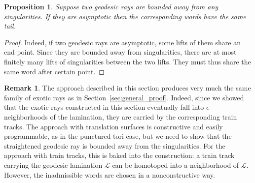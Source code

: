 \documentclass[11pt]{article} %
\theoremstyle{plain}
\newtheorem{prop}[thm]{Proposition}
\theoremstyle{definition}
\newtheorem{rmk}[thm]{Remark}
\numberwithin{equation}{section}
\begin{document}
\begin{prop}\label{prop:tail}
Suppose two geodesic rays are bounded away from any singularities. If they are asymptotic then the corresponding words have the same tail.
\end{prop}
\begin{proof}
Indeed, if two geodesic rays are asymptotic, some lifts of them share an end point. Since they are bounded away from singularities, there are at most finitely many lifts of singularities between the two lifts. They must thus share the same word after certain point.
\end{proof}
\begin{rmk}\label{rmk:same}
The approach described in this section produces very much the same family of exotic rays as in Section~\ref{sec:general_proof}. Indeed, since we showed that the exotic rays constructed in this section eventually fall into $\epsilon$-neighborhoods of the lamination, they are carried by the corresponding train tracks. The approach with translation surfaces is constructive and easily programmable, as in the punctured tori case, but we need to show that the straightened geodesic ray is bounded away from the singularities. For the approach with train tracks, this is baked into the construction: a train track carrying the geodesic lamination $\mathcal{L}$ can be homotoped into a neighborhood of $\mathcal{L}$. However, the inadmissible words are chosen in a nonconstructive way.
\end{rmk}





\end{document}
